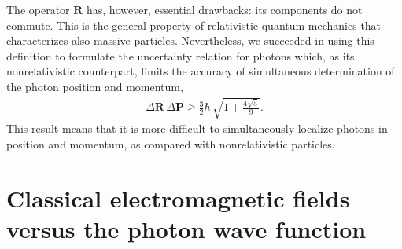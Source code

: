 \documentclass[twocolumn,aps,pra,10pt]{revtex4-1}
\begin{document}
The operator ${\bm R}$ has, however, essential drawbacks: its components do not commute. This is the general property of relativistic quantum mechanics that characterizes also massive particles.
Nevertheless, we succeeded in using this definition \cite{hur} to formulate the uncertainty relation for photons which, as its nonrelativistic counterpart, limits the accuracy of simultaneous determination of the photon position and momentum,
\begin{align}\label{phur}
\Delta{\bm R}\,\Delta{\bm P}\ge\frac{3}{2}\hbar\,\sqrt{1+\frac{4\sqrt{5}}{9}}.
\end{align}
This result means that it is more difficult to simultaneously localize photons in position and momentum, as compared with nonrelativistic particles.

\section{Classical electromagnetic fields\\versus
the photon wave function}
\end{document}
